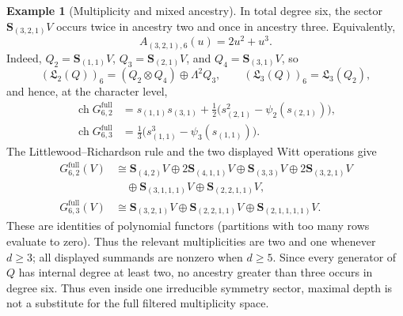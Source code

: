 \documentclass[10pt,reqno]{amsart}
\theoremstyle{plain}
\theoremstyle{definition}
\newtheorem{example}[theorem]{Example}
\theoremstyle{remark}
\begin{document}
\begin{example}[Multiplicity and mixed ancestry]
\label{cc:ex-mixed-ancestry}
In total degree six, the sector \(\mathbf S_{(3,2,1)}V\) occurs twice in
ancestry two and once in ancestry three.  Equivalently,
\begin{equation}
 A_{(3,2,1),6}(u)=2u^2+u^3.
 \label{cc:eq-mixed-polynomial}
\end{equation}
Indeed, \(Q_2=\mathbf S_{(1,1)}V\),
\(Q_3=\mathbf S_{(2,1)}V\), and
\(Q_4=\mathbf S_{(3,1)}V\), so
\[
 ({\mathfrak L}_2(Q))_6=(Q_2\otimes Q_4)\oplus\Lambda^2Q_3,
 \qquad
 ({\mathfrak L}_3(Q))_6={\mathfrak L}_3(Q_2),
\]
and hence, at the character level,
\begin{align*}
 \operatorname{ch}G^{\mathrm{full}}_{6,2}
 &=s_{(1,1)}s_{(3,1)}
   +\tfrac12\bigl(s_{(2,1)}^2-\psi_2(s_{(2,1)})\bigr),\\
 \operatorname{ch}G^{\mathrm{full}}_{6,3}
 &=\tfrac13\bigl(s_{(1,1)}^3-\psi_3(s_{(1,1)})\bigr).
\end{align*}
The Littlewood--Richardson rule \cite[Chs.~5--6 and 8]{Fulton97} and the two
displayed Witt operations give
\begin{align*}
 G^{\mathrm{full}}_{6,2}(V)
 &\cong \mathbf S_{(4,2)}V
 \oplus2\mathbf S_{(4,1,1)}V
 \oplus\mathbf S_{(3,3)}V
 \oplus2\mathbf S_{(3,2,1)}V\\
 &\quad\oplus\mathbf S_{(3,1,1,1)}V
 \oplus\mathbf S_{(2,2,1,1)}V,\\
 G^{\mathrm{full}}_{6,3}(V)
 &\cong\mathbf S_{(3,2,1)}V
 \oplus\mathbf S_{(2,2,1,1)}V
 \oplus\mathbf S_{(2,1,1,1,1)}V.
\end{align*}
These are identities of polynomial functors (partitions with too many rows
evaluate to zero).  Thus the relevant multiplicities are two and one
whenever \(d\geq3\); all displayed summands are nonzero when \(d\geq5\).
Since every generator
of \(Q\) has internal degree at least two, no ancestry greater than three
occurs in degree six.
Thus even inside one irreducible symmetry sector, maximal depth is not a
substitute for the full filtered multiplicity space.
\end{example}
\end{document}
